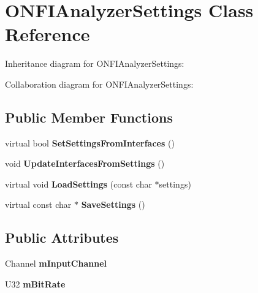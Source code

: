 \hypertarget{classONFIAnalyzerSettings}{}\section{O\+N\+F\+I\+Analyzer\+Settings Class Reference}
\label{classONFIAnalyzerSettings}


Inheritance diagram for O\+N\+F\+I\+Analyzer\+Settings\+:


Collaboration diagram for O\+N\+F\+I\+Analyzer\+Settings\+:
\subsection*{Public Member Functions}
\begin{DoxyCompactItemize}
\item 
\mbox{\label{classONFIAnalyzerSettings_a66e5b5d8451d738a3d239e2b66b8a7c9}} 
virtual bool {\bfseries Set\+Settings\+From\+Interfaces} ()
\item 
\mbox{\label{classONFIAnalyzerSettings_ad99c9ece3bc9c5f97a7abdaaecd99aa5}} 
void {\bfseries Update\+Interfaces\+From\+Settings} ()
\item 
\mbox{\label{classONFIAnalyzerSettings_a4f052e7c52483e323306de37910f4fcb}} 
virtual void {\bfseries Load\+Settings} (const char $\ast$settings)
\item 
\mbox{\label{classONFIAnalyzerSettings_abf91f7c8f7b2bf2b720e196a88645b77}} 
virtual const char $\ast$ {\bfseries Save\+Settings} ()
\end{DoxyCompactItemize}
\subsection*{Public Attributes}
\begin{DoxyCompactItemize}
\item 
\mbox{\label{classONFIAnalyzerSettings_a7485946a7c5acc78cacb209c346c5319}} 
Channel {\bfseries m\+Input\+Channel}
\item 
\mbox{\label{classONFIAnalyzerSettings_a040f25d0e55801f283d529cea6fb3d69}} 
U32 {\bfseries m\+Bit\+Rate}
\end{DoxyCompactItemize}
